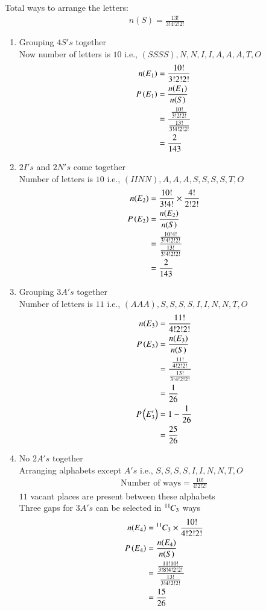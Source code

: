 \documentclass[journal,12pt,twocolumn]{IEEEtran}
\theoremstyle{remark}
\begin{document}
Total ways to arrange the letters:
\begin{align}
 n(S)
= \frac{13!}{3!4!2!2!} 
\end{align}
\begin{enumerate}[label=(\alph*)]
\item Grouping $4S's$ together \\
Now number of letters is $10$ i.e., $(SSSS), N, N, I, I, A, A, A, T, O$
\begin{align}
n(E_1) &= \frac{10!}{3!2!2!}\\
P\left(E_1\right)&= \frac{n(E_1)}{n(S)}\\ &= \frac{\frac{10!}{3!2!2!}}{\frac{13!}{3!4!2!2!}}\\
&=\frac{2}{143}
\end{align}
\item $2I's$ and $2N's$ come together\\
Number of letters is $10$ i.e., $(IINN),A,A,A,S,S,S,S,T,O$
\begin{align}
n(E_2) &= \frac{10!}{3!4!} \times \frac{4!}{2!2!}\\
P\left(E_2\right) &= \frac{n(E_2)}{n(S)}\\ &= \frac{\frac{10!4!}{3!4!2!2!}}{\frac{13!}{3!4!2!2!}}\\
&= \frac{2}{143}
\end{align}
\item Grouping $3A's$ together\\
Number of letters is $11$ i.e., $(AAA),S,S,S,S,I,I,N,N,T,O$
\begin{align}
n(E_3) &= \frac{11!}{4!2!2!}\\
P\left(E_3\right) &= \frac{n(E_3)}{n(S)} \\ &= \frac{\frac{11!}{4!2!2!}}{\frac{13!}{3!4!2!2!}}\\ &=\frac{1}{26}\\
P\left(E_3'\right)&= 1-\frac{1}{26}\\ &=\frac{25}{26}
\end{align}
\item No $2A's$ together\\
Arranging alphabets except $A's$ i.e., $S,S,S,S,I,I,N,N,T,O$
\begin{align}
\text{Number of ways} = \frac{10!}{4!2!2!}
\end{align}
$11$ vacant places are present between these alphabets\\
Three gaps for $3A's$ can be selected in ${{}^{11}\mkern-1muC_{3}}$ ways
\begin{align}
n(E_4) &= {{}^{11}\mkern-1muC_{3}} \times \frac{10!}{4!2!2!}\\
P\left(E_4\right) &= \frac{n(E_4)}{n(S)}\\&= \frac{\frac{11!10!}{3!8!4!2!2!}}{\frac{13!}{3!4!2!2!}}\\
&=\frac{15}{26}
\end{align}
\end{enumerate}
\end{document}
